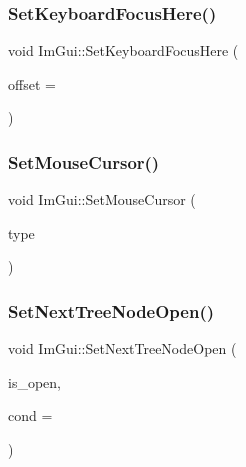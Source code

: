 \hypertarget{namespace_im_gui_ae85e5fba7e88cea8bd3ba5b687c979f2}{}\label{namespace_im_gui_ae85e5fba7e88cea8bd3ba5b687c979f2} 
\subsubsection{\texorpdfstring{Set\+Keyboard\+Focus\+Here()}{SetKeyboardFocusHere()}}
{\footnotesize\ttfamily void Im\+Gui\+::\+Set\+Keyboard\+Focus\+Here (\begin{DoxyParamCaption}\item[{int}]{offset = {} }\end{DoxyParamCaption})}

\hypertarget{namespace_im_gui_ae212a3516efcba50a684df202c8e63ad}{}\label{namespace_im_gui_ae212a3516efcba50a684df202c8e63ad} 
\subsubsection{\texorpdfstring{Set\+Mouse\+Cursor()}{SetMouseCursor()}}
{\footnotesize\ttfamily void Im\+Gui\+::\+Set\+Mouse\+Cursor (\begin{DoxyParamCaption}\item[{Im\+Gui\+Mouse\+Cursor}]{type }\end{DoxyParamCaption})}

\hypertarget{namespace_im_gui_ab9a0c20b04a753449494fb20ec2e0e87}{}\label{namespace_im_gui_ab9a0c20b04a753449494fb20ec2e0e87} 
\subsubsection{\texorpdfstring{Set\+Next\+Tree\+Node\+Open()}{SetNextTreeNodeOpen()}}
{\footnotesize\ttfamily void Im\+Gui\+::\+Set\+Next\+Tree\+Node\+Open (\begin{DoxyParamCaption}\item[{bool}]{is\+\_\+open,  }\item[{Im\+Gui\+Cond}]{cond = {} }\end{DoxyParamCaption})}

\hypertarget{namespace_im_gui_a3e9380e253a3c49665a404e56950a52a}{}\label{namespace_im_gui_a3e9380e253a3c49665a404e56950a52a} 
